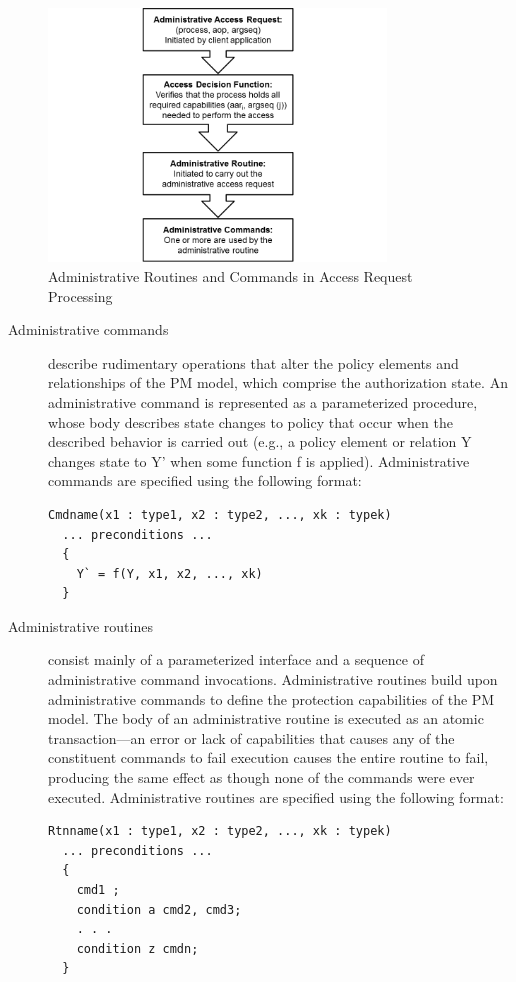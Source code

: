 \documentclass[12pt,a4paper,titlepage]{book}
\begin{document}
	\begin{figure}[h]
		\centering
		\includegraphics[width = 0.8\textwidth]{images/AdministrativeRoutinesCommandsAccessRequestProcessing.png}
		\caption{Administrative Routines and Commands in Access Request Processing}
		\label{fig:AdministrativeRoutinesCommandsAccessRequestProcessing}
	\end{figure}
	
	\begin{description}
		
		\item[Administrative commands] describe rudimentary operations that alter the policy elements and relationships of the PM model, which comprise the authorization state. An administrative command is represented as a parameterized procedure, whose body describes state changes to policy that occur when the described behavior is carried out (e.g., a policy element or relation Y changes state to Y' when some function f is applied). Administrative commands are specified using the following format:
		\begin{lstlisting}
Cmdname(x1 : type1, x2 : type2, ..., xk : typek)
  ... preconditions ...
  {
    Y` = f(Y, x1, x2, ..., xk)
  }
		\end{lstlisting}
		
		\item[Administrative routines] consist mainly of a parameterized interface and a  sequence of  administrative command invocations. Administrative routines build upon administrative commands to define the protection capabilities of the PM model. The body of an administrative routine is executed as an atomic transaction—an error or lack of capabilities that causes any of the constituent commands to fail execution causes the entire routine to fail, producing the same effect as though none of the commands were ever executed. Administrative routines are specified using the following format:
		\begin{lstlisting}
Rtnname(x1 : type1, x2 : type2, ..., xk : typek)
  ... preconditions ...
  {
    cmd1 ;
    condition a cmd2, cmd3;
    . . .
    condition z cmdn;
  }
	  \end{lstlisting}

	\end{description}
\end{document}
